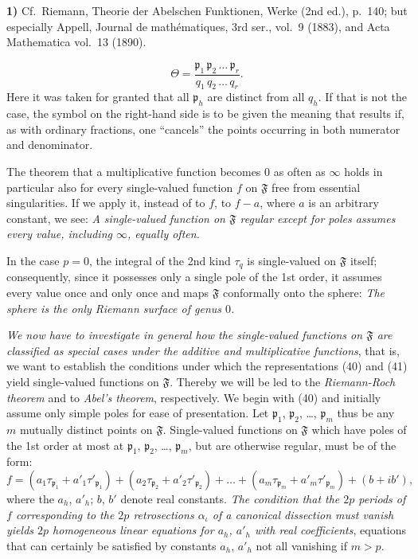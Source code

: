 \documentclass{article}
\begin{document}
\textbf{1)} Cf.\ Riemann, Theorie der Abelschen Funktionen, Werke (2nd ed.), p.~140; but especially Appell, Journal de mathématiques, 3rd ser., vol.~9 (1883), and Acta Mathematica vol.~13 (1890).

\[ \Theta = \frac{\mathfrak{p}_1 \, \mathfrak{p}_2 \, \dots \, \mathfrak{p}_r}{q_1 \, q_2 \, \dots \, q_r}. \tag{41} \]
Here it was taken for granted that all $\mathfrak{p}_h$ are distinct from all $q_h$. If that is not the case, the symbol on the right-hand side is to be given the meaning that results if, as with ordinary fractions, one ``cancels'' the points occurring in both numerator and denominator.

The theorem that a multiplicative function becomes $0$ as often as $\infty$ holds in particular also for every single-valued function $f$ on $\mathfrak{F}$ free from essential singularities. If we apply it, instead of to $f$, to $f - a$, where $a$ is an arbitrary constant, we see: \emph{A single-valued function on $\mathfrak{F}$ regular except for poles assumes every value, including $\infty$, equally often.}

In the case $p = 0$, the integral of the 2nd kind $\tau_q$ is single-valued on $\mathfrak{F}$ itself; consequently, since it possesses only a single pole of the 1st order, it assumes every value once and only once and maps $\mathfrak{F}$ conformally onto the sphere: \emph{The sphere is the only Riemann surface of genus $0$.}

\emph{We now have to investigate in general how the single-valued functions on $\mathfrak{F}$ are classified as special cases under the additive and multiplicative functions}, that is, we want to establish the conditions under which the representations (40) and (41) yield single-valued functions on $\mathfrak{F}$. Thereby we will be led to the \emph{Riemann-Roch theorem} and to \emph{Abel's theorem}, respectively. We begin with (40) and initially assume only simple poles for ease of presentation. Let $\mathfrak{p}_1$, $\mathfrak{p}_2$, \dots, $\mathfrak{p}_m$ thus be any $m$ mutually distinct points on $\mathfrak{F}$. Single-valued functions on $\mathfrak{F}$ which have poles of the 1st order at most at $\mathfrak{p}_1$, $\mathfrak{p}_2$, \dots, $\mathfrak{p}_m$, but are otherwise regular, must be of the form:
\[ f = (a_1\tau_{\mathfrak{p}_1} + a'_1\tau'_{\mathfrak{p}_1}) + (a_2\tau_{\mathfrak{p}_2} + a'_2\tau'_{\mathfrak{p}_2}) + \dots + (a_m\tau_{\mathfrak{p}_m} + a'_m\tau'_{\mathfrak{p}_m}) + (b + i b'), \tag{42} \]
where the $a_h$, $a'_h$; $b$, $b'$ denote real constants. \emph{The condition that the $2p$ periods of $f$ corresponding to the $2p$ retrosections $\alpha_\iota$ of a canonical dissection must vanish yields $2p$ homogeneous linear equations for $a_h$, $a'_h$ with real coefficients}, equations that can certainly be satisfied by constants $a_h$, $a'_h$ not all vanishing if $m > p$.
\end{document}
